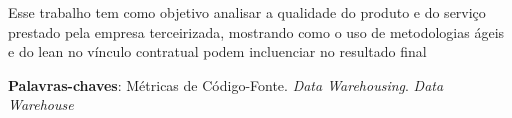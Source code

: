 \begin{resumo}

Esse trabalho tem como objetivo analisar a qualidade do produto e do serviço prestado pela empresa terceirizada, mostrando como o uso de metodologias ágeis e do lean no vínculo contratual podem incluenciar no resultado final
	

 \vspace{\onelineskip}
    
 \noindent
 \textbf{Palavras-chaves}: Métricas de Código-Fonte. \textit{Data Warehousing}. \textit{Data Warehouse}
\end{resumo}
